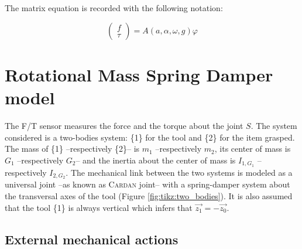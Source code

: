 \documentclass[\main/main.tex]{subfiles}
\begin{document}
The matrix equation is recorded with the following notation:

\begin{equation}
  \label{appendix:rigid:matrix}
 \begin{pmatrix}
  f    \\
  \tau
 \end{pmatrix}
 = A(a, \alpha, \omega, g) \varphi
\end{equation}

\newpage

\section{Rotational Mass Spring Damper model}
\label{appendix:rmsd}

The F/T sensor measures the force and the torque about the joint $S$.
The system considered is a two-bodies system: \{1\} for the tool and \{2\} for the item grasped. The mass of \{1\} –respectively \{2\}– is $m_1$ –respectively $m_2$, its center of mass is $G_1$ –respectively $G_2$– and the inertia about the center of mass is $I_{1, G_1}$ –respectively $I_{2, G_2}$. The mechanical link between the two systems is modeled as a universal joint –as known as \textsc{Cardan} joint– with a spring-damper system about the transversal axes of the tool (Figure \ref{fig:tikz:two_bodies}). It is also assumed that the tool \{1\} is always vertical which infers that $\overrightarrow{z_1} = -\overrightarrow{z_0}$.

\subsection{External mechanical actions}
\end{document}

